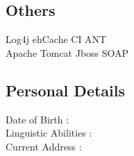 \documentclass[]{prashant-resume-openfont}
\begin{document}
\begin{minipage}[t]{0.33\textwidth}
\subsection{Others}
Log4j \textbullet{}ehCache \textbullet{}CI \textbullet{}ANT\\
Apache Tomcat \textbullet{} Jboss \textbullet{} SOAP
\sectionsep
\subsection{Personal Details}
Date of Birth : {}\\
Linguistic Abilities	:  { }\\
Current Address	: 
\sectionsep

%
%

\end{minipage} 
\hfill
\end{document}
